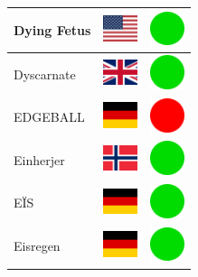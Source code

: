 \documentclass[12pt, a4paper, twoside]{report}
\begin{document}
\begin{center}
\begin{longtable}{|p{5cm}|p{2cm}|p{2cm}|}
 Dying Fetus                                                & \includegraphics[width=1cm]{../img/flags/us} &   \includegraphics[width=1cm]{../likes/y} \\ \hline
 Dyscarnate                                                 & \includegraphics[width=1cm]{../img/flags/gb} &   \includegraphics[width=1cm]{../likes/y} \\ \hline
 EDGEBALL                                                   & \includegraphics[width=1cm]{../img/flags/de} &   \includegraphics[width=1cm]{../likes/n} \\ \hline
 Einherjer                                                  & \includegraphics[width=1cm]{../img/flags/no} &   \includegraphics[width=1cm]{../likes/y} \\ \hline
 EÏS                                                        & \includegraphics[width=1cm]{../img/flags/de} &   \includegraphics[width=1cm]{../likes/y} \\ \hline
 Eisregen                                                   & \includegraphics[width=1cm]{../img/flags/de} &   \includegraphics[width=1cm]{../likes/y} \\ \hline

\end{longtable}
\end{center}
\end{document}
